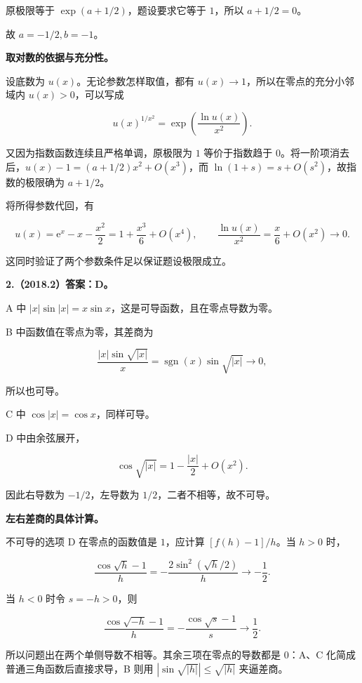 \documentclass[UTF8,11pt,fontset=windows]{ctexart}
\begin{document}
原极限等于 $\exp(a+1/2)$，题设要求它等于 $1$，所以 $a+1/2=0$。

故 $a=-1/2,b=-1$。

\textbf{取对数的依据与充分性。}

设底数为 $u(x)$。无论参数怎样取值，都有 $u(x)\to1$，所以在零点的充分小邻域内 $u(x)>0$，可以写成

$$
u(x)^{1/x^2}=\exp\!\left(\frac{\ln u(x)}{x^2}\right).
$$

又因为指数函数连续且严格单调，原极限为 $1$ 等价于指数趋于 $0$。将一阶项消去后，$u(x)-1=(a+1/2)x^2+O(x^3)$，而 $\ln(1+s)=s+O(s^2)$，故指数的极限确为 $a+1/2$。

将所得参数代回，有

$$
u(x)=\mathrm e^x-x-\frac{x^2}{2}=1+\frac{x^3}{6}+O(x^4),
\qquad
\frac{\ln u(x)}{x^2}=\frac{x}{6}+O(x^2)\longrightarrow0.
$$

这同时验证了两个参数条件足以保证题设极限成立。

\clearpage

\textbf{2.（2018.2）答案：D。}

A 中 $|x|\sin|x|=x\sin x$，这是可导函数，且在零点导数为零。

B 中函数值在零点为零，其差商为

$$
\frac{|x|\sin\sqrt{|x|}}x
=\operatorname{sgn}(x)\sin\sqrt{|x|}\longrightarrow0,
$$

所以也可导。

C 中 $\cos|x|=\cos x$，同样可导。

D 中由余弦展开，

$$
\cos\sqrt{|x|}=1-\frac{|x|}{2}+O(x^2).
$$

因此右导数为 $-1/2$，左导数为 $1/2$，二者不相等，故不可导。

\textbf{左右差商的具体计算。}

不可导的选项 D 在零点的函数值是 $1$，应计算 $[f(h)-1]/h$。当 $h>0$ 时，

$$
\frac{\cos\sqrt h-1}{h}
=-\frac{2\sin^2(\sqrt h/2)}{h}\longrightarrow-\frac12.
$$

当 $h<0$ 时令 $s=-h>0$，则

$$
\frac{\cos\sqrt{-h}-1}{h}
=-\frac{\cos\sqrt s-1}{s}\longrightarrow\frac12.
$$

所以问题出在两个单侧导数不相等。其余三项在零点的导数都是 $0$：A、C 化简成普通三角函数后直接求导，B 则用 $|\sin\sqrt{|h|}|\le\sqrt{|h|}$ 夹逼差商。

\clearpage
\end{document}
